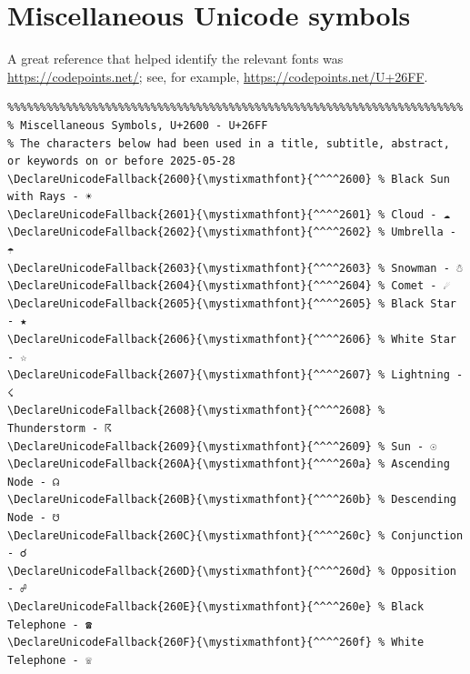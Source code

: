 \documentclass[12pt, twoside]{article}
\begin{document}
\section{Miscellaneous Unicode symbols}
\label{sec:unicodeSymbols}
A great reference that helped identify the relevant fonts was \url{https://codepoints.net/}; see, for example, \url{https://codepoints.net/U+26FF}.
\noindent
\begingroup
\captionsetup{type=listing,hypcap=false}
\caption{U+2600--U+26FF Miscellaneous Symbols}
\label{lst:unicodeSymbols}
\vspace{\abovecaptionskip}
\begin{verbatim}
%%%%%%%%%%%%%%%%%%%%%%%%%%%%%%%%%%%%%%%%%%%%%%%%%%%%%%%%%%%%%%%%%%%%%%
% Miscellaneous Symbols, U+2600 - U+26FF
% The characters below had been used in a title, subtitle, abstract, or keywords on or before 2025-05-28
\DeclareUnicodeFallback{2600}{\mystixmathfont}{^^^^2600} % Black Sun with Rays - ☀
\DeclareUnicodeFallback{2601}{\mystixmathfont}{^^^^2601} % Cloud - ☁
\DeclareUnicodeFallback{2602}{\mystixmathfont}{^^^^2602} % Umbrella - ☂
\DeclareUnicodeFallback{2603}{\mystixmathfont}{^^^^2603} % Snowman - ☃
\DeclareUnicodeFallback{2604}{\mystixmathfont}{^^^^2604} % Comet - ☄
\DeclareUnicodeFallback{2605}{\mystixmathfont}{^^^^2605} % Black Star - ★
\DeclareUnicodeFallback{2606}{\mystixmathfont}{^^^^2606} % White Star - ☆
\DeclareUnicodeFallback{2607}{\mystixmathfont}{^^^^2607} % Lightning - ☇
\DeclareUnicodeFallback{2608}{\mystixmathfont}{^^^^2608} % Thunderstorm - ☈
\DeclareUnicodeFallback{2609}{\mystixmathfont}{^^^^2609} % Sun - ☉
\DeclareUnicodeFallback{260A}{\mystixmathfont}{^^^^260a} % Ascending Node - ☊
\DeclareUnicodeFallback{260B}{\mystixmathfont}{^^^^260b} % Descending Node - ☋
\DeclareUnicodeFallback{260C}{\mystixmathfont}{^^^^260c} % Conjunction - ☌
\DeclareUnicodeFallback{260D}{\mystixmathfont}{^^^^260d} % Opposition - ☍
\DeclareUnicodeFallback{260E}{\mystixmathfont}{^^^^260e} % Black Telephone - ☎
\DeclareUnicodeFallback{260F}{\mystixmathfont}{^^^^260f} % White Telephone - ☏

\end{verbatim}
\newpage
\end{document}
